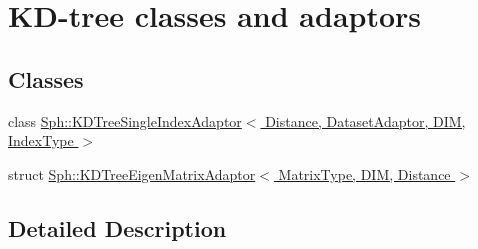 \hypertarget{group__kdtrees__grp}{}\section{K\+D-\/tree classes and adaptors}
\label{group__kdtrees__grp}
\subsection*{Classes}
\begin{DoxyCompactItemize}
\item 
class \hyperlink{classSph_1_1KDTreeSingleIndexAdaptor}{Sph\+::\+K\+D\+Tree\+Single\+Index\+Adaptor$<$ Distance, Dataset\+Adaptor, D\+I\+M, Index\+Type $>$}
\item 
struct \hyperlink{structSph_1_1KDTreeEigenMatrixAdaptor}{Sph\+::\+K\+D\+Tree\+Eigen\+Matrix\+Adaptor$<$ Matrix\+Type, D\+I\+M, Distance $>$}
\end{DoxyCompactItemize}


\subsection{Detailed Description}
